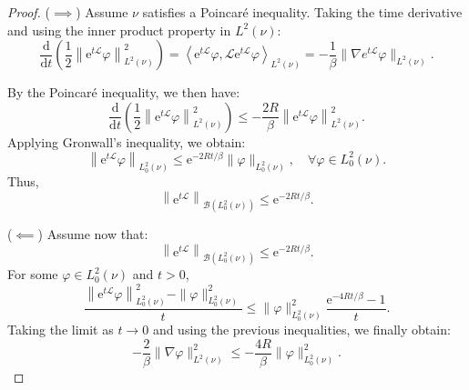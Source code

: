 \documentclass[11pt, twoside]{report}
\begin{document}
\begin{proof}
($\implies$) Assume $\nu$ satisfies a Poincar\'{e} inequality. Taking the time derivative and using the inner product property in $L^2(\nu)$:
\begin{equation*}
\frac{\mathrm{d}}{\mathrm{d} t} \left( \frac{1}{2} \left \| \mathrm{e}^{t\mathcal{L}} \varphi \right \|_{L^2(\nu)}^2 \right) = \left\langle \mathrm{e}^{t \mathcal{L}} \varphi, \mathcal{L} \mathrm{e}^{t \mathcal{L}} \varphi \right\rangle_{L^2(\nu)} = -\frac{1}{\beta} \|\nabla e^{t \mathcal{L}} \varphi \|_{L^2(\nu)}.
\end{equation*}

By the Poincar\'{e} inequality, we then have:
\begin{equation}
\frac{\mathrm{d}}{\mathrm{d} t} \left( \frac{1}{2} \left \| \mathrm{e}^{t\mathcal{L}} \varphi \right \|^2_{L^2(\nu)} \right) \leq -\frac{2 R}{\beta} \left\| \mathrm{e}^{t \mathcal{L}} \varphi \right\|_{L^2(\nu)}^2.
\end{equation}
Applying Gronwall's inequality, we obtain:
\begin{equation}
\left \| \mathrm{e}^{t \mathcal{L}} \varphi \right\|_{L_0^2(\nu)} \leqslant \mathrm{e}^{-2 R t / \beta} \| \varphi \|_{L_0^2(\nu)}, \quad \forall \varphi \in L_0^2(\nu).
\end{equation}
Thus,
\begin{equation}
\left \| \mathrm{e}^{t \mathcal{L}} \right\|_{\mathcal{B}\left(L_0^2(\nu)\right)} \leqslant \mathrm{e}^{-2 R t / \beta}.
\end{equation}

($\impliedby$) Assume now that:
\begin{equation}
\left \| \mathrm{e}^{t\mathcal{L}} \right \|_{\mathcal{B}\left(L_0^2(\nu)\right)} \leqslant \mathrm{e}^{-2 R t / \beta}.
\end{equation}
For some $\varphi \in L^2_0(\nu)$ and $t>0$,
\begin{equation}
\frac{\left \| \mathrm{e}^{t \mathcal{L}} \varphi \right\|_{L_0^2(\nu)}^2 - \| \varphi \|_{L_0^2(\nu)}^2}{t} \leqslant \| \varphi \|_{L_0^2(\nu)}^2 \frac{\mathrm{e}^{-4 R t / \beta} - 1}{t}.
\end{equation}
Taking the limit as $t \to 0$ and using the previous inequalities, we finally obtain:
\begin{equation}
-\frac{2}{\beta} \| \nabla \varphi \|_{L^2(\nu)}^2 \leqslant -\frac{4 R}{\beta} \| \varphi \|_{L_0^2(\nu)}^2.
\end{equation}
\end{proof}
\end{document}
